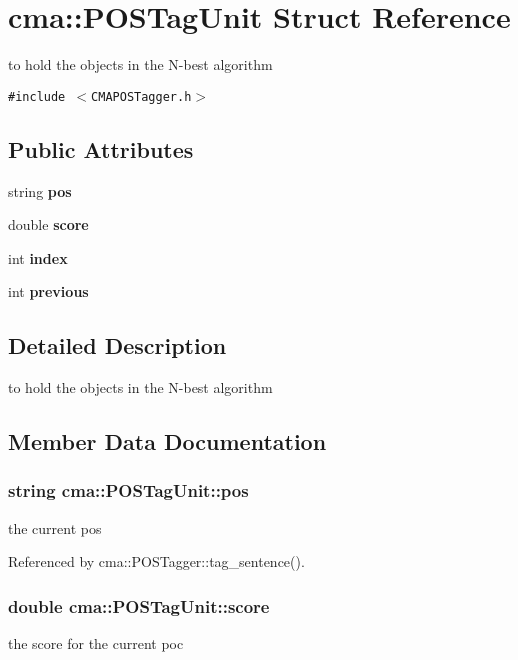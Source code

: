 \section{cma::POSTagUnit Struct Reference}
\label{structcma_1_1POSTagUnit}
to hold the objects in the N-best algorithm  


{\tt \#include $<$CMAPOSTagger.h$>$}

\subsection*{Public Attributes}
\begin{CompactItemize}
\item 
string {\bf pos}
\item 
double {\bf score}
\item 
int {\bf index}
\item 
int {\bf previous}
\end{CompactItemize}


\subsection{Detailed Description}
to hold the objects in the N-best algorithm 

\subsection{Member Data Documentation}
\subsubsection{\setlength{\rightskip}{0pt plus 5cm}string {\bf cma::POSTagUnit::pos}}\label{structcma_1_1POSTagUnit_695dce4497a36b42431d5506fdccf30e}


the current pos 

Referenced by cma::POSTagger::tag\_\-sentence().
\subsubsection{\setlength{\rightskip}{0pt plus 5cm}double {\bf cma::POSTagUnit::score}}\label{structcma_1_1POSTagUnit_8256b2cd6fab35e40cc1bc2dd3b39ce2}


the score for the current poc 

